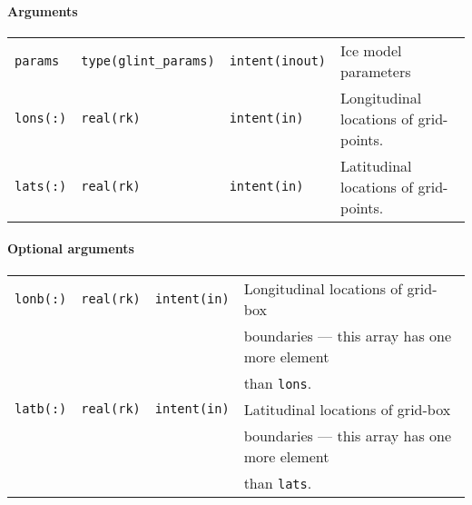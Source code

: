 \paragraph{Arguments}
%
\begin{center}
\begin{tabular}{llll}
\texttt{params} & \texttt{type(glint\_params)} & \texttt{intent(inout)} &
Ice model parameters \\
\texttt{lons(:)} & \texttt{real(rk)} & \texttt{intent(in)} & Longitudinal
locations of grid-points.\\ 
\texttt{lats(:)} & \texttt{real(rk)} & \texttt{intent(in)} & Latitudinal
locations of grid-points.\\ 
\end{tabular}
\end{center}
%
\paragraph{Optional arguments}
%
\begin{center}
\begin{tabular}{llll}
\texttt{lonb(:)} & \texttt{real(rk)} & \texttt{intent(in)} & Longitudinal
locations of grid-box \\
 & & & boundaries --- this array has one more element \\
 & & & than \texttt{lons}. \\
\texttt{latb(:)} & \texttt{real(rk)} & \texttt{intent(in)} & Latitudinal
locations of grid-box \\
 & & & boundaries --- this array has one more element \\
 & & & than \texttt{lats}. \\
\end{tabular}
\end{center}
%

